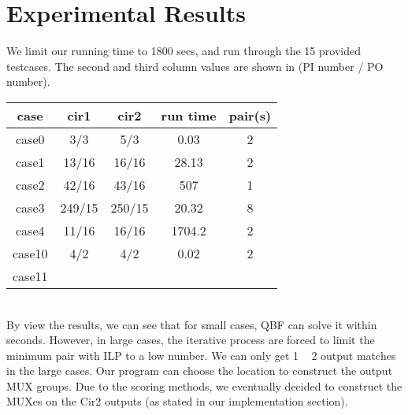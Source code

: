 \section{Experimental Results}

We limit our running time to 1800 secs, and run through the 15 provided testcases. The second and third column values are shown in (PI number / PO number).\\

\begin{tabular}{|c|c|c|c|c|}
\hline
case & cir1 & cir2 & run time & pair(s) \\
\hline
case0 & 3/3 & 5/3 & 0.03 & 2 \\
\hline
case1 & 13/16 & 16/16 & 28.13 & 2 \\
\hline
case2 & 42/16 & 43/16 & 507 & 1 \\
\hline
case3 & 249/15 & 250/15 & 20.32 & 8 \\
\hline
case4 & 11/16 & 16/16 & 1704.2 & 2 \\
\hline
case10 & 4/2 & 4/2 & 0.02 & 2 \\
\hline
case11 &&&& \\
\hline
\end{tabular}
\\

By view the results, we can see that for small cases, QBF can solve it within seconds. However, in large cases, the iterative process are forced to limit the minimum pair with ILP to a low number. We can only get 1 ~ 2 output matches in the large cases.
Our program can choose the location to construct the output MUX groups. Due to the scoring methods, we eventually decided to construct the MUXes on the Cir2 outputs (as stated in our implementation section).



